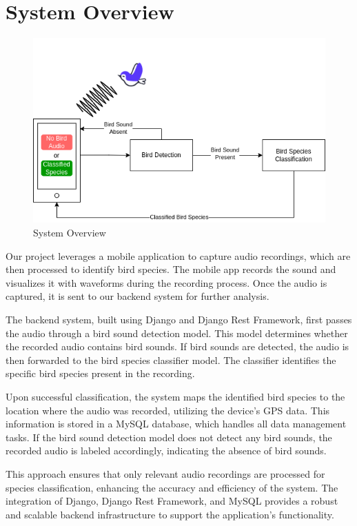 \section{System Overview}
\begin{figure}[h!]
    \centering
    \includegraphics[scale=0.65]{images/System Overview.png}
    \caption{System Overview}%
\end{figure}

Our project leverages a mobile application to capture audio recordings, which are then processed to identify bird species. The mobile app records the sound and visualizes it with waveforms during the recording process. Once the audio is captured, it is sent to our backend system for further analysis.

The backend system, built using Django and Django Rest Framework, first passes the audio through a bird sound detection model. This model determines whether the recorded audio contains bird sounds. If bird sounds are detected, the audio is then forwarded to the bird species classifier model. The classifier identifies the specific bird species present in the recording.

Upon successful classification, the system maps the identified bird species to the location where the audio was recorded, utilizing the device's GPS data. This information is stored in a MySQL database, which handles all data management tasks. If the bird sound detection model does not detect any bird sounds, the recorded audio is labeled accordingly, indicating the absence of bird sounds.

This approach ensures that only relevant audio recordings are processed for species classification, enhancing the accuracy and efficiency of the system. The integration of Django, Django Rest Framework, and MySQL provides a robust and scalable backend infrastructure to support the application's functionality.
\\

